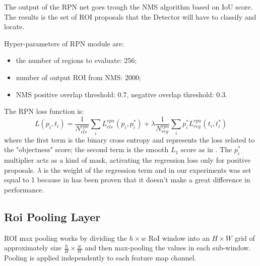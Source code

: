 \documentclass[a4paper,10pt]{report}
\begin{document}
The output of the RPN net goes trough the NMS algorithm based on IoU score. The results is the set of ROI proposals that the Detector will have to classify and locate.

Hyper-parameters of RPN module are:
\begin{itemize}
    \item the number of regions to evaluate: 256;
    \item number of output ROI from NMS: 2000;
    \item NMS positive overlap threshold: 0.7, negative overlap threshold: 0.3.
\end{itemize}

The RPN loss function is:
\[L({p_i}, {t_i}) = \dfrac{1}{N_{cls}^{rpn}} \sum_{i} L_{cls}^{rpn}(p_i, p_i^*) + \lambda \dfrac{1}{N_{reg}^{rpn}} \sum_{i} p_i^* L_{reg}^{rpn}(t_i, t_i^*) \]	
where the first term is the binary cross entropy and represents the loss related to the "objectness" score; the second term is the smooth $L_1$ score as in \cite{huber-loss}. 
The $p_i^*$ multiplier acts as a kind of mask, activating the regression loss only for positive proposals.
$\lambda$ is the weight of the regression term and in our experiments was set equal to 1 because in \cite{faster-rcnn} has been proven that it doesn't make a great difference in performance.

\subsection{Roi Pooling Layer}\label{subsec:roi-pooling}
ROI max pooling works by dividing the $h \times w$ RoI window into an $H \times W$ grid of approximately size $\frac{h}{H} \times \frac{w}{W}$ and then max-pooling the values in each sub-window. Pooling is applied independently to each feature map channel.
\end{document}

